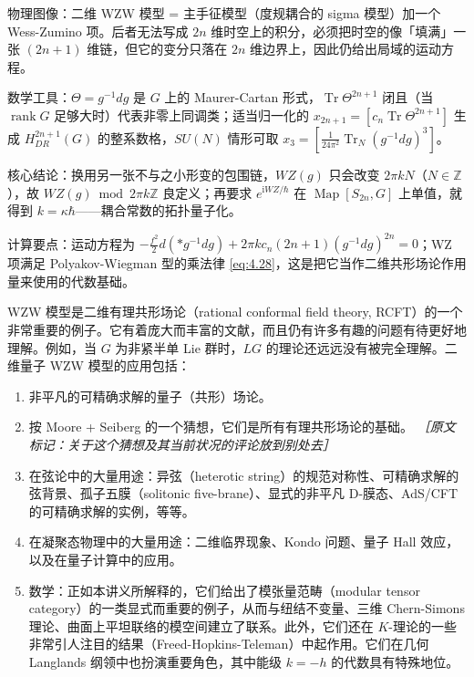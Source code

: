 \begin{keytakeaways}
  \item 物理图像：二维 WZW 模型 = 主手征模型（度规耦合的 sigma 模型）加一个 Wess-Zumino 项。后者无法写成 $2n$ 维时空上的积分，必须把时空的像「填满」一张 $(2n+1)$ 维链，但它的变分只落在 $2n$ 维边界上，因此仍给出局域的运动方程。
  \item 数学工具：$\Theta=g^{-1}dg$ 是 $G$ 上的 Maurer-Cartan 形式，$\operatorname{Tr}\Theta^{2n+1}$ 闭且（当 $\operatorname{rank}G$ 足够大时）代表非零上同调类；适当归一化的 $x_{2n+1}=[c_n\operatorname{Tr}\Theta^{2n+1}]$ 生成 $H^{2n+1}_{DR}(G)$ 的整系数格，$SU(N)$ 情形可取 $x_3=[\frac{1}{24\pi^2}\operatorname{Tr}_N(g^{-1}dg)^3]$。
  \item 核心结论：换用另一张不与之小形变的包围链，$WZ(g)$ 只会改变 $2\pi kN$（$N\in\mathbb{Z}$），故 $WZ(g)\bmod 2\pi k\mathbb{Z}$ 良定义；再要求 $e^{\mathrm{i}WZ/\hbar}$ 在 $\operatorname{Map}[S_{2n},G]$ 上单值，就得到 $k=\kappa\hbar$——耦合常数的拓扑量子化。
  \item 计算要点：运动方程为 $-\frac{f^2}{2}d(*g^{-1}dg)+2\pi kc_n(2n+1)(g^{-1}dg)^{2n}=0$；WZ 项满足 Polyakov-Wiegman 型的乘法律 \eqref{eq:4.28}，这是把它当作二维共形场论作用量来使用的代数基础。
\end{keytakeaways}

WZW 模型是二维有理共形场论（rational conformal field theory, RCFT）的一个非常重要的例子。它有着庞大而丰富的文献，而且仍有许多有趣的问题有待更好地理解。例如，当 $G$ 为非紧半单 Lie 群时，$LG$ 的理论还远远没有被完全理解。二维量子 WZW 模型的应用包括：

\begin{enumerate}
  \item 非平凡的可精确求解的量子（共形）场论。

  \item 按 Moore + Seiberg 的一个猜想，它们是所有有理共形场论的基础。
  {\small\itshape ［原文标记：关于这个猜想及其当前状况的评论放到别处去］}

  \item 在弦论中的大量用途：异弦（heterotic string）的规范对称性、可精确求解的弦背景、孤子五膜（solitonic five-brane）、显式的非平凡 D-膜态、AdS/CFT 的可精确求解的实例，等等。

  \item 在凝聚态物理中的大量用途：二维临界现象、Kondo 问题、量子 Hall 效应，以及在量子计算中的应用。

  \item 数学：正如本讲义所解释的，它们给出了模张量范畴（modular tensor category）的一类显式而重要的例子，从而与纽结不变量、三维 Chern-Simons 理论、曲面上平坦联络的模空间建立了联系。此外，它们还在 $K$-理论的一些非常引人注目的结果（Freed-Hopkins-Teleman）中起作用。它们在几何 Langlands 纲领中也扮演重要角色，其中能级 $k=-h$ 的代数具有特殊地位。
\end{enumerate}

